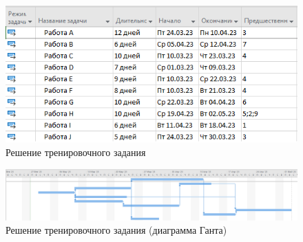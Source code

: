 \begin{figure}[H]
	\begin{center}
		\includegraphics[scale=1.0]{imgs/task_0_0.png}
	\end{center}
	\caption{Решение тренировочного задания}
	\label{img:label}
\end{figure}

\begin{figure}[H]
	\begin{center}
		\includegraphics[width=\textwidth]{imgs/task_0_1.png}
	\end{center}
	\caption{Решение тренировочного задания (диаграмма Ганта)}
	\label{img:label}
\end{figure}